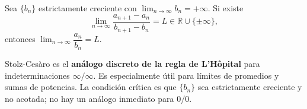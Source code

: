 \begin{theorem}
Sea $\{b_n\}$ estrictamente creciente con $\lim_{n\to\infty} b_n = +\infty$.
Si existe
\[
  \lim_{n \to \infty} \frac{a_{n+1} - a_n}{b_{n+1} - b_n} = L
  \in \mathbb{R} \cup \{\pm\infty\},
\]
entonces $\displaystyle\lim_{n \to \infty} \dfrac{a_n}{b_n} = L$.
\end{theorem}

\begin{rem}
Stolz-Cesàro es el \textbf{análogo discreto de la regla de L'Hôpital}
para indeterminaciones $\infty/\infty$. Es especialmente útil para
límites de promedios y sumas de potencias. La condición crítica es que
$\{b_n\}$ sea estrictamente creciente y no acotada; no hay un análogo
inmediato para $0/0$.
\end{rem}

